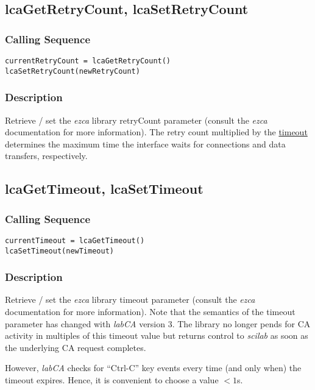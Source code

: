 \documentclass{article}
\newcommand{\sca}{\ita{labCA}}
\newcommand{\scilab}{\ita{scilab}}
\newcommand{\ezca}{\ita{ezca}}
\newcommand{\pbrk}{\pagebreak[3]}
\newcommand{\ita}[1]{\emph{#1}}
\renewcommand{\pbrk}{}
\begin{document}
\vspace*{\fill}
\pbrk
\subsection{lcaGetRetryCount, lcaSetRetryCount}
\label{retrycnt}
\subsubsection{Calling Sequence}
\begin{verbatim}
currentRetryCount = lcaGetRetryCount()
lcaSetRetryCount(newRetryCount)
\end{verbatim}
\subsubsection{Description}
Retrieve / set the \ezca{} library retryCount parameter (consult the \ezca{}
documentation for more information). The retry count multiplied by the
\hyperref{timeout parameter}{timeout parameter (see }{ )}{timeout}
determines the maximum time the interface waits for connections and data
transfers, respectively.

\vspace*{\fill}
\pbrk
\subsection{lcaGetTimeout, lcaSetTimeout}
\label{timeout}
\subsubsection{Calling Sequence}
\begin{verbatim}
currentTimeout = lcaGetTimeout()
lcaSetTimeout(newTimeout)
\end{verbatim}
\subsubsection{Description}
Retrieve / set the \ezca{} library timeout parameter (consult the \ezca{}
documentation for more information). Note that the semantics of the
timeout parameter has changed with \sca{} version 3. The library no longer
pends for CA activity in multiples of this timeout value but returns
control to \scilab{} as soon as the underlying CA request completes.

However, \sca{} checks for ``Ctrl-C'' key events every time
(and only when) the timeout expires. Hence, it is convenient to
choose a value $<1$s.
\end{document}
